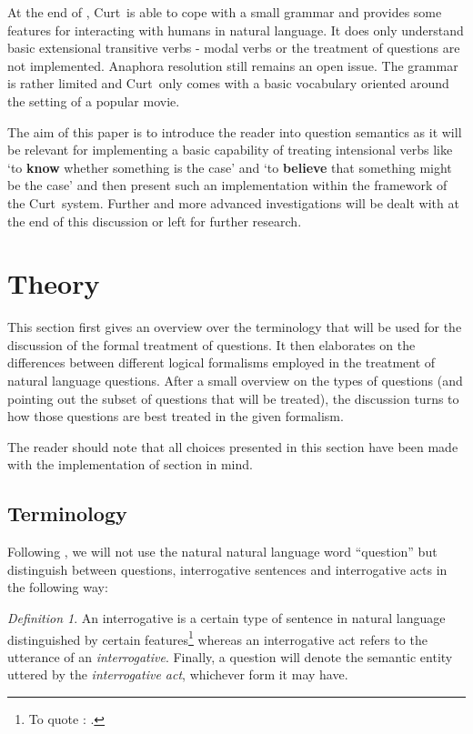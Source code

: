 \documentclass[12pt,a4paper]{article}
\newcommand{\stress}{\textbf} %
\newcommand{\term}{\textsf} %
\newcommand{\pn}{\textsf} %
\newcommand{\curt}{\pn{Curt}\mbox{ }}
\theoremstyle{remark} \newtheorem*{termin}{Definition} %
\begin{document}
At the end of \cite{blackburnbos:cl1}, \curt is able to cope with a small
grammar and provides some features for interacting with humans in natural
language. It does only understand basic extensional transitive verbs - modal
verbs or the treatment of questions are not implemented. Anaphora resolution
still remains an open issue. The grammar is rather limited and \curt only comes
with a basic vocabulary oriented around the setting of a popular movie.

The aim of this paper is to introduce the reader into question semantics as it
will be relevant for implementing a basic capability of treating intensional
verbs like `to \stress{know} whether something is the case' and `to
\stress{believe} that something might be the case' and then present such an
implementation within the framework of the \curt system. Further and more
advanced investigations will be dealt with at the end of this discussion or left
for further research.

\section{Theory}

This section first gives an overview over the terminology that will be used for
the discussion of the formal treatment of questions. It then elaborates on the
differences between different logical formalisms employed in the treatment of
natural language questions. After a small overview on the types of questions
(and pointing out the subset of questions that will be treated), %
the discussion
turns to how those questions are best treated in the given formalism.

The reader should note that all choices presented in this section have been made
with the implementation of section \label{sec:implementation} in mind.


\subsection{Terminology}

Following \cite{gs:q}, we will not use the natural natural language word
``question'' but distinguish between \term{questions},
\term{interrogative sentences} and \term{interrogative acts} in the following
way:

\begin{termin}
  An \term{interrogative} is a certain type of sentence in natural language
  distinguished by certain features\footnote{To quote \cite{gs:q}: .}
  whereas an \term{interrogative act} refers to the utterance of an
  \emph{interrogative}. Finally, a 
  \term{question} will denote the semantic entity uttered by the
  \emph{interrogative act}, whichever form it may have.
\end{termin}
\end{document}
